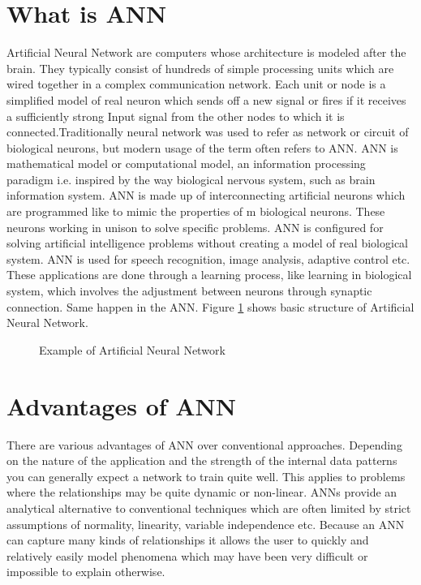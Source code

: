 \documentclass[12pt]{report}
\begin{document}
\section{What is ANN}
Artificial Neural Network are computers whose architecture is modeled after the brain. They typically consist of hundreds of simple processing units which are wired together in a complex communication network. Each unit or node is a simplified model of real neuron which sends off a new signal or fires if it receives a sufficiently strong Input signal from the other nodes to which it is connected.Traditionally neural network was used to refer as network or circuit of biological neurons, but modern usage of the term often refers to ANN. ANN is mathematical model or computational model, an information processing paradigm i.e. inspired by the way biological nervous system, such as brain information system. ANN is made up of interconnecting artificial neurons which are programmed like to mimic the properties of m biological neurons. These neurons working in unison to solve specific problems. ANN is configured for solving artificial intelligence problems without creating a model of real biological system. ANN is used for speech recognition, image analysis, adaptive control etc. These applications are done through a learning process, like learning in biological system, which involves the adjustment between neurons through synaptic connection. Same happen in the ANN. Figure \ref{ANN} shows basic structure of Artificial Neural Network.
\begin{figure}[htbp]
	\caption{Example of Artificial Neural Network}
	\label{ANN}
\end{figure}
\section{Advantages of ANN}
There are various advantages of ANN over conventional approaches. Depending on the nature of the application and the strength of the internal data patterns you can generally expect a network to train quite well. This applies to problems where the relationships may be quite dynamic or non-linear. ANNs provide an analytical alternative to conventional techniques which are often limited by strict assumptions of normality, linearity, variable independence etc. Because an ANN can capture many kinds of relationships it allows the user to quickly and relatively easily model phenomena which may have been very difficult or impossible to explain otherwise.
\end{document}
